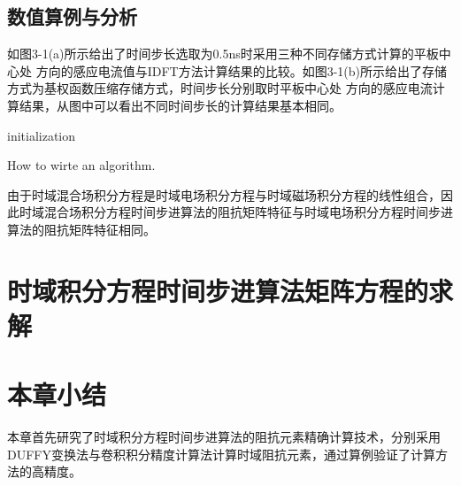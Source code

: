 \documentclass{standalone}
\begin{document}
\subsection{数值算例与分析}

如图3-1(a)所示给出了时间步长选取为0.5ns时采用三种不同存储方式计算的平板中心处 方向的感应电流值与IDFT方法计算结果的比较。如图3-1(b)所示给出了存储方式为基权函数压缩存储方式，时间步长分别取时平板中心处 方向的感应电流计算结果，从图中可以看出不同时间步长的计算结果基本相同。

\begin{algorithm}[H]
	initialization\;
\caption{How to wirte an algorithm.}
\end{algorithm}

由于时域混合场积分方程是时域电场积分方程与时域磁场积分方程的线性组合，因此时域混合场积分方程时间步进算法的阻抗矩阵特征与时域电场积分方程时间步进算法的阻抗矩阵特征相同。

\section{时域积分方程时间步进算法矩阵方程的求解}

\section{本章小结}
本章首先研究了时域积分方程时间步进算法的阻抗元素精确计算技术，分别采用DUFFY变换法与卷积积分精度计算法计算时域阻抗元素，通过算例验证了计算方法的高精度。
\end{document}
